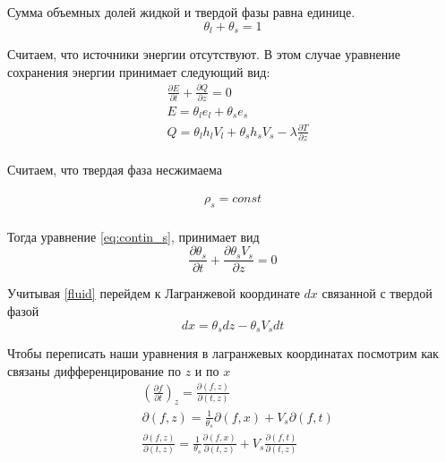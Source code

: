 \documentclass[12pt,a4paper]{article}
\newcommand{\pd}[2]{\frac{\partial #1}{\partial #2}}
\begin{document}
Сумма объемных долей жидкой и твердой фазы равна единице.
\begin{equation}
\theta_l + \theta_s = 1
\label{eq:satur}
\end{equation}

Считаем, что источники энергии отсутствуют. В этом случае уравнение сохранения энергии принимает следующий вид:
\begin{equation}
\begin{aligned}
&\pd{E}{t} + \pd{Q}{z} =0 \\
&E=\theta_l e_l + \theta_s e_s \\
&Q=\theta_l h_l V_l + \theta_s h_s V_s - \lambda \pd{T}{z}\\
\label{eq:conserv}
\end{aligned}
\end{equation}

Считаем, что твердая фаза несжимаема

\begin{equation}
\begin{aligned}
\rho_s = const \\
\label{rho_const}
\end{aligned}
\end{equation}

Тогда уравнение \eqref{eq:contin_s}, принимает вид
\begin{equation}
\pd{\theta_s}{t} + \pd{\theta_s V_s}{z} = 0
\label{fluid}
\end{equation}

Учитывая \eqref{fluid} перейдем к Лагранжевой координате $dx$ связанной с твердой фазой
\begin{equation}
dx = \theta_s dz - \theta_s V_s dt
\label{dx_dz}
\end{equation}

Чтобы переписать наши уравнения в лагранжевых координатах посмотрим как связаны дифференцирование по $ z $ и по $ x $
\begin{equation}
\begin{aligned}
&\left(\pd{f}{t}\right)_z = \pd{(f , z)}{(t , z)}\\
&\partial(f , z) = \frac{1}{\theta_s}\partial(f , x) + V_s \partial(f , t)\\
&\pd{(f , z)}{(t , z)} = \frac{1}{\theta_s}\pd{(f , x)}{(t , z)} + V_s\pd{(f , t)}{(t , z)}\\
\end{aligned}
\label{help1}
\end{equation}
\end{document}
